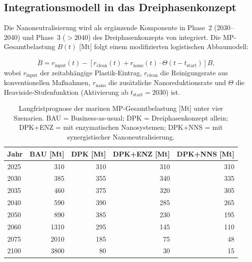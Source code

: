 ﻿\documentclass[12pt,a4paper]{article}
\theoremstyle{definition}
\theoremstyle{remark}
\begin{document}
\subsection{Integrationsmodell in das Dreiphasenkonzept}

Die Nanoneutralisierung wird als ergänzende Komponente in Phase~2 (2030--2040)
und Phase~3 ($> 2040$) des Dreiphasenkonzepts von \cite{cleanocn_epp2026}
integriert. Die MP-Gesamtbelastung $B(t)$ [Mt] folgt einem modifizierten
logistischen Abbaumodell:

\begin{equation}
  \dot{B} = r_{\text{input}}(t) - \left[r_{\text{clean}}(t) +
             r_{\text{nano}}(t) \cdot \Theta(t - t_{\text{start}})\right] B,
  \label{eq:langzeit_ode}
\end{equation}
wobei $r_{\text{input}}$ der zeitabhängige Plastik-Eintrag,
$r_{\text{clean}}$ die Reinigungsrate aus konventionellen Maßnahmen,
$r_{\text{nano}}$ die zusätzliche Nanoreduktionsrate und
$\Theta$ die Heaviside-Stufenfunktion (Aktivierung ab $t_{\text{start}} = 2030$) ist.

\begin{table}[H]
\centering
\caption{Langfristprognose der marinen MP-Gesamtbelastung [Mt] unter vier Szenarien.
  BAU = Business-as-usual; DPK = Dreiphasenkonzept allein; DPK+ENZ = mit enzymatischen
  Nanosystemen; DPK+NNS = mit synergistischer Nanoneutralisierung.}
\label{tab:langzeitprognose}
\begin{tabular}{lrrrr}
\toprule
\textbf{Jahr} & \textbf{BAU [Mt]} & \textbf{DPK [Mt]} & \textbf{DPK+ENZ [Mt]} & \textbf{DPK+NNS [Mt]} \\
\midrule
2025 & 310 & 310 & 310 & 310 \\
2030 & 385 & 355 & 340 & 335 \\
2035 & 460 & 375 & 320 & 305 \\
2040 & 590 & 390 & 285 & 265 \\
2050 & 890 & 385 & 230 & 195 \\
2060 & 1310 & 295 & 145 & 110 \\
2075 & 2010 & 185 & 75  & 48  \\
2100 & 3800 & 80  & 30  & 15  \\
\bottomrule
\end{tabular}
\end{table}
\end{document}
